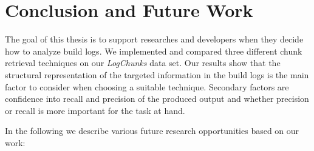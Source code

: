 \documentclass[\myrootdir/main.tex]{subfiles}
\begin{document}
\chapter{Conclusion and Future Work}
\label{sec:conclusion-fw}
The goal of this thesis is to support researches and developers when they decide how to analyze build logs.
We implemented and compared three different chunk retrieval techniques on our \emph{LogChunks} data set.
Our results show that the structural representation of the targeted information in the build logs is the main factor to consider when choosing a suitable technique.
Secondary factors are confidence into recall and precision of the produced output and whether precision or recall is more important for the task at hand.

In the following we describe various future research opportunities based on our work:
\end{document}
